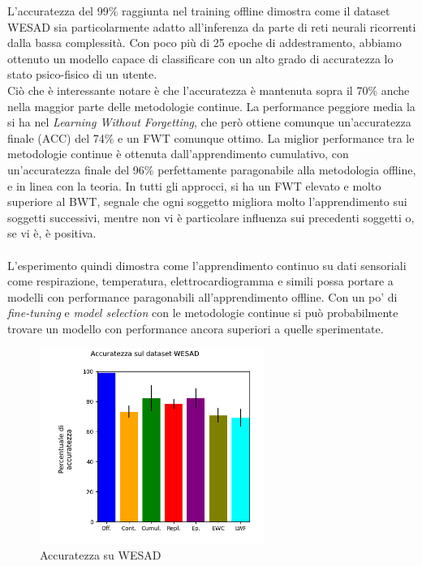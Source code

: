 L'accuratezza del 99\% raggiunta nel training offline dimostra come il dataset WESAD sia particolarmente adatto all'inferenza da parte di reti neurali ricorrenti dalla bassa complessità. Con poco più di 25 epoche di addestramento, abbiamo ottenuto un modello capace di classificare con un alto grado di accuratezza lo stato psico-fisico di un utente.\\
Ciò che è interessante notare è che l'accuratezza è mantenuta sopra il 70\% anche nella maggior parte delle metodologie continue. La performance peggiore media la si ha nel \textit{Learning Without Forgetting}, che però ottiene comunque un'accuratezza finale (ACC) del 74\% e un FWT comunque ottimo. La miglior performance tra le metodologie continue è ottenuta dall'apprendimento cumulativo, con un'accuratezza finale del 96\% perfettamente paragonabile alla metodologia offline, e in linea con la teoria. In tutti gli approcci, si ha un FWT elevato e molto superiore al BWT, segnale che ogni soggetto migliora molto l'apprendimento sui soggetti successivi, mentre non vi è particolare influenza sui precedenti soggetti o, se vi è, è positiva.\\\\
L'esperimento quindi dimostra come l'apprendimento continuo su dati sensoriali come respirazione, temperatura, elettrocardiogramma e simili possa portare a modelli con performance paragonabili all'apprendimento offline. Con un po' di \textit{fine-tuning} e \textit{model selection} con le metodologie continue si può probabilmente trovare un modello con performance ancora superiori a quelle sperimentate.
\begin{figure}[h]
	\begin{center}
		\includegraphics[width=0.65\textwidth]{img/graphs/wesad_final_accuracy.png}
		\caption{Accuratezza su WESAD}
		\label{fig:wesad_accuracy_graph}
	\end{center}
\end{figure}
